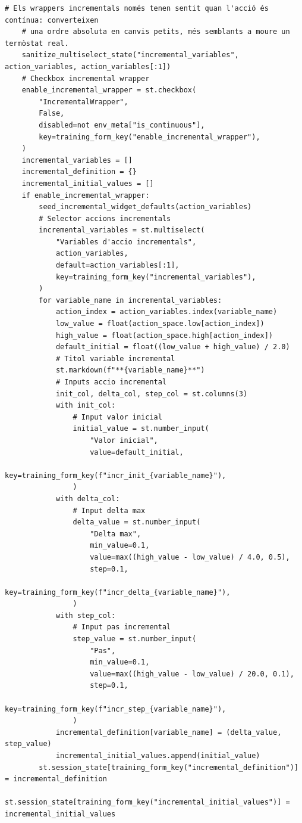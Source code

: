 \documentclass[10pt,a4paper]{article}
\begin{document}
\begin{lstlisting}[style=studioPython,caption={page\_components/training\_wrappers.py},label={lst:page-components-training-wrappers-py}]
    # Els wrappers incrementals només tenen sentit quan l'acció és contínua: converteixen
    # una ordre absoluta en canvis petits, més semblants a moure un termòstat real.
    sanitize_multiselect_state("incremental_variables", action_variables, action_variables[:1])
    # Checkbox incremental wrapper
    enable_incremental_wrapper = st.checkbox(
        "IncrementalWrapper",
        False,
        disabled=not env_meta["is_continuous"],
        key=training_form_key("enable_incremental_wrapper"),
    )
    incremental_variables = []
    incremental_definition = {}
    incremental_initial_values = []
    if enable_incremental_wrapper:
        seed_incremental_widget_defaults(action_variables)
        # Selector accions incrementals
        incremental_variables = st.multiselect(
            "Variables d'accio incrementals",
            action_variables,
            default=action_variables[:1],
            key=training_form_key("incremental_variables"),
        )
        for variable_name in incremental_variables:
            action_index = action_variables.index(variable_name)
            low_value = float(action_space.low[action_index])
            high_value = float(action_space.high[action_index])
            default_initial = float((low_value + high_value) / 2.0)
            # Titol variable incremental
            st.markdown(f"**{variable_name}**")
            # Inputs accio incremental
            init_col, delta_col, step_col = st.columns(3)
            with init_col:
                # Input valor inicial
                initial_value = st.number_input(
                    "Valor inicial",
                    value=default_initial,
                    key=training_form_key(f"incr_init_{variable_name}"),
                )
            with delta_col:
                # Input delta max
                delta_value = st.number_input(
                    "Delta max",
                    min_value=0.1,
                    value=max((high_value - low_value) / 4.0, 0.5),
                    step=0.1,
                    key=training_form_key(f"incr_delta_{variable_name}"),
                )
            with step_col:
                # Input pas incremental
                step_value = st.number_input(
                    "Pas",
                    min_value=0.1,
                    value=max((high_value - low_value) / 20.0, 0.1),
                    step=0.1,
                    key=training_form_key(f"incr_step_{variable_name}"),
                )
            incremental_definition[variable_name] = (delta_value, step_value)
            incremental_initial_values.append(initial_value)
        st.session_state[training_form_key("incremental_definition")] = incremental_definition
        st.session_state[training_form_key("incremental_initial_values")] = incremental_initial_values


\end{lstlisting}
\end{document}
